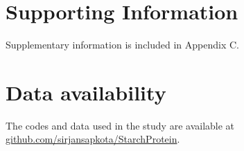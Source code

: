 \documentclass[10pt,letterpaper]{article}
\begin{document}
\section*{Supporting Information}
Supplementary information is included in Appendix C.

\section*{Data availability}
The codes and data used in the study are available at \href{https://github.com/sirjansapkota/StarchProtein}{github.com/sirjansapkota/StarchProtein}.

\setcounter{figure}{0}
\renewcommand{\thefigure}{\arabic{figure}}





\printbibliography


\end{document}
